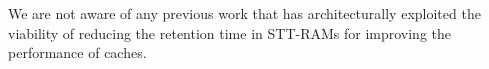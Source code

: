 We are not aware of any previous work that has architecturally exploited the viability of reducing the retention time in STT-RAMs for improving the performance of caches.
